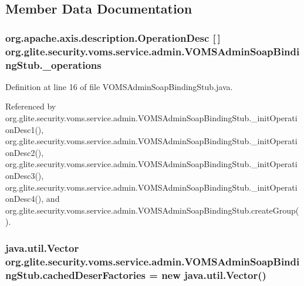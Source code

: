 \subsection{Member Data Documentation}
\hypertarget{classorg_1_1glite_1_1security_1_1voms_1_1service_1_1admin_1_1VOMSAdminSoapBindingStub_af51610a352251fae1a50730c49eb0a57}{
\subsubsection[{\_\-operations}]{\setlength{\rightskip}{0pt plus 5cm}org.apache.axis.description.OperationDesc \mbox{[}$\,$\mbox{]} {\bf org.glite.security.voms.service.admin.VOMSAdminSoapBindingStub.\_\-operations}}}
\label{classorg_1_1glite_1_1security_1_1voms_1_1service_1_1admin_1_1VOMSAdminSoapBindingStub_af51610a352251fae1a50730c49eb0a57}


Definition at line 16 of file VOMSAdminSoapBindingStub.java.



Referenced by org.glite.security.voms.service.admin.VOMSAdminSoapBindingStub.\_\-initOperationDesc1(), org.glite.security.voms.service.admin.VOMSAdminSoapBindingStub.\_\-initOperationDesc2(), org.glite.security.voms.service.admin.VOMSAdminSoapBindingStub.\_\-initOperationDesc3(), org.glite.security.voms.service.admin.VOMSAdminSoapBindingStub.\_\-initOperationDesc4(), and org.glite.security.voms.service.admin.VOMSAdminSoapBindingStub.createGroup().

\hypertarget{classorg_1_1glite_1_1security_1_1voms_1_1service_1_1admin_1_1VOMSAdminSoapBindingStub_a73e5ca0b5a895386516bb7ec7bee06fe}{
\subsubsection[{cachedDeserFactories}]{\setlength{\rightskip}{0pt plus 5cm}java.util.Vector {\bf org.glite.security.voms.service.admin.VOMSAdminSoapBindingStub.cachedDeserFactories} = new java.util.Vector()}}
\label{classorg_1_1glite_1_1security_1_1voms_1_1service_1_1admin_1_1VOMSAdminSoapBindingStub_a73e5ca0b5a895386516bb7ec7bee06fe}



